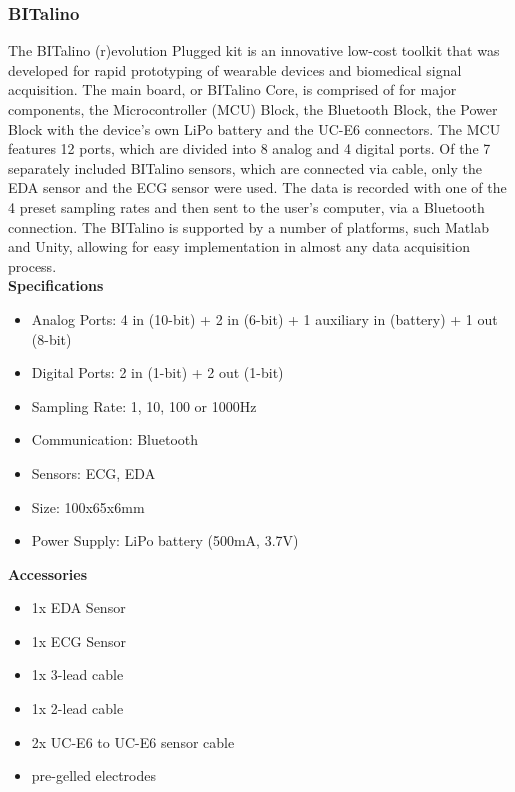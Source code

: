\subsubsection{BITalino}
The BITalino (r)evolution Plugged kit is an innovative low-cost toolkit that was developed for rapid prototyping of wearable devices and biomedical signal acquisition. The main board, or BITalino Core, is comprised of for major components, the Microcontroller (MCU) Block, the Bluetooth Block, the Power Block with the device's own LiPo battery and the UC-E6 connectors. The MCU features 12 ports, which are divided into 8 analog and 4 digital ports. Of the 7 separately included BITalino sensors, which are connected via cable, only the EDA sensor and the ECG sensor were used. The data is recorded with one of the 4 preset sampling rates and then sent to the user's computer, via a Bluetooth connection. The BITalino is supported by a number of platforms, such Matlab and Unity, allowing for easy implementation in almost any data acquisition process.\\

\textbf{Specifications}
\begin{itemize}
\item Analog Ports: 4 in (10-bit) + 2 in (6-bit) + 1 auxiliary in (battery) + 1 out (8-bit)
\item Digital Ports: 2 in (1-bit) + 2 out (1-bit)
\item Sampling Rate: 1, 10, 100 or 1000Hz
\item Communication: Bluetooth
\item Sensors: ECG, EDA
\item Size: 100x65x6mm
\item Power Supply: LiPo battery (500mA, 3.7V)
\end{itemize}

\textbf{Accessories}
\begin{itemize}
\item 1x EDA Sensor
\item 1x ECG Sensor
\item 1x 3-lead cable
\item 1x 2-lead cable
\item 2x UC-E6 to UC-E6 sensor cable
\item pre-gelled electrodes
\end{itemize}


